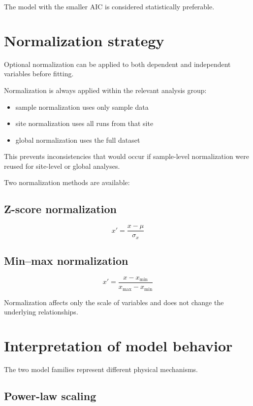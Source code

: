 \documentclass[11pt]{article}
\begin{document}
The model with the smaller AIC is considered statistically preferable.

\section{Normalization strategy}

Optional normalization can be applied to both dependent and independent variables before fitting.

Normalization is always applied within the relevant analysis group:

\begin{itemize}

\item sample normalization uses only sample data

\item site normalization uses all runs from that site

\item global normalization uses the full dataset

\end{itemize}

This prevents inconsistencies that would occur if sample-level normalization were reused for site-level or global analyses.

Two normalization methods are available:

\subsection{Z-score normalization}

\[
x' = \frac{x-\mu}{\sigma_x}
\]

\subsection{Min–max normalization}

\[
x' = \frac{x-x_{\min}}{x_{\max}-x_{\min}}
\]

Normalization affects only the scale of variables and does not change the underlying relationships.

\section{Interpretation of model behavior}

The two model families represent different physical mechanisms.

\subsection{Power-law scaling}
\end{document}
